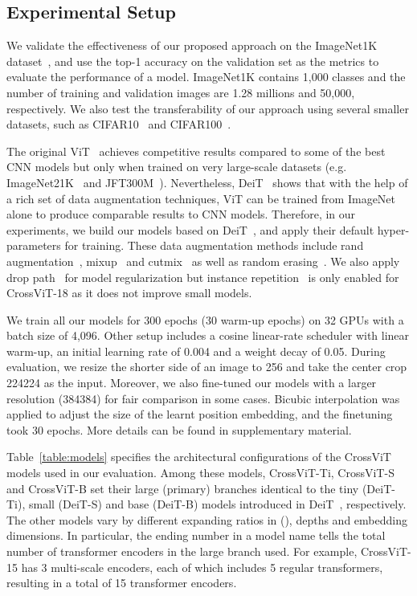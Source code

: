 \documentclass[10pt,twocolumn,letterpaper]{article}
\def\ours{CrossViT\xspace}
\newcommand{\myparagraph}[1]{\vspace{1mm} \noindent {\textbf{#1}}}
\newcommand{\myparagraphfirst}[1]{\vspace{0mm} \noindent {\textbf{#1}}}
\begin{document}
\subsection{Experimental Setup}
\myparagraphfirst{Dataset.}
We validate the effectiveness of our proposed approach on the ImageNet1K dataset~\cite{imagenet_deng2009}, and use the top-1 accuracy on the validation set as the metrics to evaluate the performance of a model. ImageNet1K contains 1,000 classes and the number of training and validation images are 1.28 millions and 50,000, respectively. 
We also test the transferability of our approach using several smaller datasets, such as CIFAR10~\cite{cifar_krizhevsky2009learning} and CIFAR100~\cite{cifar_krizhevsky2009learning}. 


\myparagraph{Training and Evaluation.}
The original ViT~\cite{ViT_dosovitskiy2021an} achieves competitive results compared to some of the best CNN models but only when trained on very large-scale datasets (e.g. ImageNet21K~\cite{imagenet_deng2009} and JFT300M~\cite{JFT300M_ICCV_2017}). Nevertheless, DeiT~\cite{DeiT_touvron2020} shows that  with the help of a rich set of data augmentation techniques, ViT can be trained from ImageNet alone to produce comparable results to CNN models. Therefore, in our experiments, we build our models based on DeiT~\cite{DeiT_touvron2020}, and apply their default hyper-parameters for training. These data augmentation methods include rand augmentation~\cite{RandAug_NEURIPS2020_Cubuk}, mixup~\cite{Mixup_zhang2018} and cutmix~\cite{CutMix_Yun_2019_ICCV} as well as random erasing~\cite{RandomErasing_Zhong_2020}. We also apply drop path~\cite{efficientnet_pmlr_tan_19} for model regularization but instance repetition~\cite{InstanceRepetition_Hoffer_2020_CVPR} is only enabled for \ours-18 as it does not improve small models. 

We train all our models for 300 epochs (30 warm-up epochs) on 32 GPUs with a batch size of 4,096. Other setup includes a cosine linear-rate scheduler with linear warm-up, an initial learning rate of 0.004 and a weight decay of 0.05. During evaluation, we resize the shorter side of an image to 256 and take the center crop 224224 as the input.
Moreover, we also fine-tuned our models with a larger resolution (384384) for fair comparison in some cases. Bicubic interpolation was applied to adjust the size of the learnt position embedding, and the finetuning took 30 epochs. More details can be found in supplementary material.


\myparagraph{Models.}
Table~\ref{table:models} specifies the architectural configurations of the \ours models used in our evaluation. Among these models, \ours-Ti, \ours-S and \ours-B set their large (primary) branches identical to the tiny (DeiT-Ti), small (DeiT-S) and base (DeiT-B) models introduced in DeiT~\cite{DeiT_touvron2020}, respectively. 
The other models vary by different expanding ratios in  (), depths and embedding dimensions. In particular, the ending number in a model name tells the total number of transformer encoders in the large branch used. For example, \ours-15 has 3 multi-scale encoders, each of which includes 5 regular transformers, resulting in a total of 15 transformer encoders. 
\end{document}
